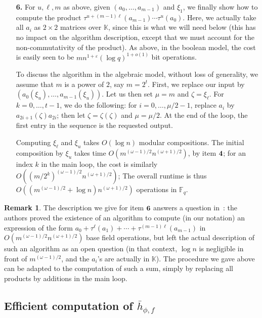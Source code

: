 \documentclass[11pt]{article}
\theoremstyle{definition}
\newtheorem{remark}{Remark}
\def\F{\ensuremath{\mathbb{F}}}
\def\K{\ensuremath{\mathbb{K}}}
\begin{document}
\begin{enumerate}
\item [{\bf 6.}] For $u,\ell,m$ as above, given $(a_0,\dots,a_{m-1})$
  and $\xi_1$, we finally show how to compute the product
  $\tau^{u+(m-1)\ell}(a_{m-1}) \cdots \tau^{u}(a_0).$ Here, we
  actually take all $a_i$ as $2\times 2$ matrices over $\K$, since
  this is what we will need below (this has no impact on the algorithm
  description, except that we must account for the non-commutativity
  of the product). As above, in the boolean model, the cost is easily
  seen to be $m n^{1+\varepsilon} (\log q)^{1+o(1)}$ bit operations.
  
  To discuss the algorithm in the algebraic model, without loss of
  generality, we assume that $m$ is a power of $2$, say
  $m=2^t$. First, we replace our input by
  $(a_0(\xi_u),\dots,a_{m-1}(\xi_u))$. Let us then set $\mu=m$ and
  $\zeta=\xi_\ell$.  For $k=0,\dots,t-1$, we do the following: for
  $i=0,\dots,\mu/2-1$, replace $a_i$ by $a_{2i+1}(\zeta) a_{2i}$; then
  let $\zeta=\zeta(\zeta)$ and $\mu=\mu/2$.  At the end of the loop,
  the first entry in the sequence is the requested output.

  Computing $\xi_\ell$ and $\xi_u$ takes $O(\log n)$ modular
  compositions.  The initial composition by $\xi_u$ takes time
  $O(m^{(\omega-1)/2}n^{(\omega+1)/2})$, by item ${\bf 4}$; for an
  index $k$ in the main loop, the cost is similarly
  $O((m/2^k)^{(\omega-1)/2}n^{(\omega+1)/2})$; The overall runtime is
  thus $O((m^{(\omega-1)/2}+\log n)n^{(\omega+1)/2})$
  operations in $\F_q$.
\end{enumerate}


\begin{remark}
  The description we give for item ${\bf 6}$ answers a question
  in~\cite[Section~3.2]{ks}: the authors proved the existence of an
  algorithm to compute (in our notation) an expression of the form
  $a_0 + \tau^\ell(a_1) + \cdots + \tau^{(m-1)\ell}(a_{m-1})$
in
  $O(m^{(\omega-1)/2}n^{(\omega+1)/2})$ base field operations, but left
  the actual description of such an algorithm as an open question
  (in that context, $\log n$ is negligible in front of $m^{(\omega-1)/2}$,
  and the $a_i$'s are actually in $\K$).
  The procedure we gave above can be adapted to the computation
  of such a sum, simply by replacing all products by additions 
  in the main loop.
\end{remark}


\subsection{Efficient computation of $\bar h_{\phi,f}$}
\end{document}
